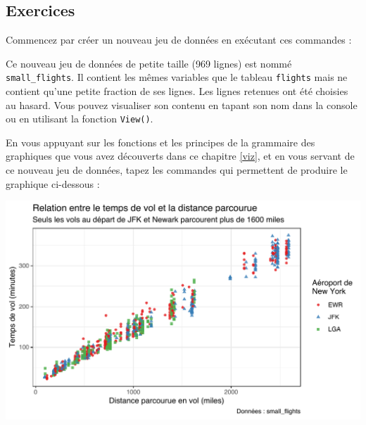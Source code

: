 \documentclass[
  a4paper,
]{article}
\newenvironment{Shaded}{\begin{snugshade}}{\end{snugshade}}
\newcommand{\DecValTok}[1]{\textcolor[rgb]{0.69,0.50,0.00}{#1}}
\newcommand{\KeywordTok}[1]{\textcolor[rgb]{0.12,0.11,0.11}{\textbf{#1}}}
\newcommand{\NormalTok}[1]{\textcolor[rgb]{0.12,0.11,0.11}{#1}}
\newcommand{\OperatorTok}[1]{\textcolor[rgb]{0.12,0.11,0.11}{#1}}
\newcommand{\StringTok}[1]{\textcolor[rgb]{0.75,0.01,0.01}{#1}}
\begin{document}
\hypertarget{Exo-3}{%
\subsection{Exercices}\label{Exo-3}}

Commencez par créer un nouveau jeu de données en exécutant ces commandes :

\begin{Shaded}
\end{Shaded}

Ce nouveau jeu de données de petite taille (969 lignes) est nommé \texttt{small\_flights}. Il contient les mêmes variables que le tableau \texttt{flights} mais ne contient qu'une petite fraction de ses lignes. Les lignes retenues ont été choisies au hasard. Vous pouvez visualiser son contenu en tapant son nom dans la console ou en utilisant la fonction \texttt{View()}.

En vous appuyant sur les fonctions et les principes de la grammaire des graphiques que vous avez découverts dans ce chapitre \ref{viz}, et en vous servant de ce nouveau jeu de données, tapez les commandes qui permettent de produire le graphique ci-dessous :

\begin{center}\includegraphics[width=0.9\linewidth]{figure/exercice-1} \end{center}
\end{document}
